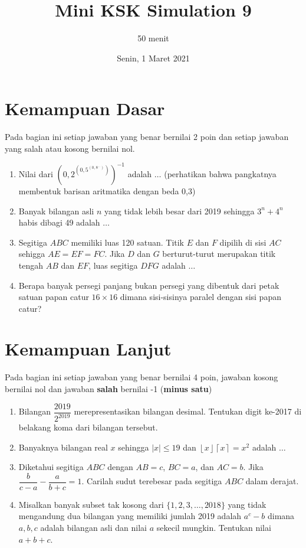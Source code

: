 \documentclass[12pt]{scrartcl}
\title{Mini KSK Simulation 9 }
\author{50 menit}
\date{Senin, 1 Maret 2021}
\begin{document}
	\maketitle

\renewcommand*\contentsname{Daftar Isi}
\tableofcontents

\newpage
	
	\section{Kemampuan Dasar}
	Pada bagian ini setiap jawaban yang benar bernilai 2 poin dan setiap jawaban yang salah
	atau kosong bernilai nol.
	\begin{enumerate}
		\item Nilai dari $\left(0,2 ^{\left(0,5 ^{\left(0,8 ^{...} \right)} \right)} \right)^{-1}$ adalah $\dots$ (perhatikan bahwa pangkatnya membentuk barisan aritmatika dengan beda 0,3)
		
		\item Banyak bilangan asli $n$ yang tidak lebih besar dari 2019 sehingga $3^n+4^n$ habis dibagi 49 adalah $\dots$
		
		
		
		\item Segitiga $ABC$ memiliki luas 120 satuan. Titik $E$ dan $F$ dipilih di sisi $AC$ sehigga $AE=EF=FC$. Jika $D$ dan $G$ berturut-turut merupakan titik tengah $AB$ dan $EF$, luas segitiga $DFG$ adalah $\dots$
		
		\item
		Berapa banyak persegi panjang bukan persegi yang dibentuk dari petak satuan papan catur $16 \times 16$ dimana sisi-sisinya paralel dengan sisi papan catur?
		
	\end{enumerate}

\section{Kemampuan Lanjut}
Pada bagian ini setiap jawaban yang benar bernilai 4 poin, jawaban kosong bernilai nol
dan jawaban \textbf{salah} bernilai -1 (\textbf{minus satu})

\begin{enumerate}[resume]
	\item Bilangan $\dfrac{2019}{2^{2019}}$ merepresentasikan bilangan desimal. Tentukan digit ke-2017 di belakang koma dari bilangan tersebut.
	
	\item Banyaknya bilangan real $x$ sehingga $|x| \le 19$ dan $\left \lfloor x \right \rfloor\left \lceil x \right \rceil = x^2$ adalah $\dots$
	
	\item Diketahui segitiga $ABC$ dengan $AB=c$, $BC=a$, dan $AC=b$. Jika $\dfrac{b}{c-a} - \dfrac{a}{b+c} = 1$. Carilah sudut terebesar pada segitiga $ABC$ dalam derajat.
	
	\item
	Misalkan banyak subset tak kosong dari $\{1,2,3,\dots,2018\}$ yang tidak mengandung dua bilangan yang memiliki jumlah 2019 adalah $a^c-b$ dimana $a,b,c$ adalah bilangan asli dan nilai $a$ sekecil mungkin. Tentukan nilai $a+b+c$.
	
	
\end{enumerate}
\end{document}
